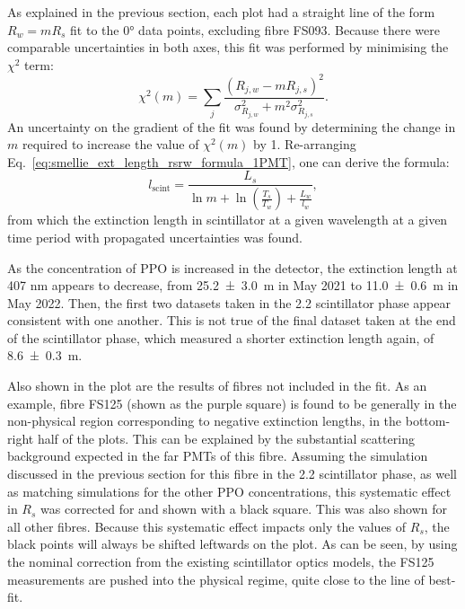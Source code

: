 As explained in the previous section, each plot had a straight line of the form $R_{w} = mR_{s}$ fit to the \ang{0} data points, excluding fibre FS093. Because there were comparable uncertainties in both axes, this fit was performed by minimising the $\chi^{2}$ term:
\begin{equation}
    \chi^{2}(m) = \sum_{j}\frac{\left(R_{j,w} - mR_{j,s}\right)^{2}}{\sigma^{2}_{R_{j,w}} + m^{2}\sigma^{2}_{R_{j,s}}}.
\end{equation}
An uncertainty on the gradient of the fit was found by determining the change in $m$ required to increase the value of $\chi^{2}(m)$ by 1. Re-arranging Eq.~\ref{eq:smellie_ext_length_rsrw_formula_1PMT}, one can derive the formula:
\begin{equation}
    l_{\mathrm{scint}} = 
    \frac{
        L_{s}
        }{
        \ln{m}
        + \ln\left(
            \frac{T_{s}}{T_{w}}
        \right)
        + \frac{L_{w}}{l_{w}}
    },
\end{equation}
from which the extinction length in scintillator at a given wavelength at a given time period with propagated uncertainties was found.

As the concentration of PPO is increased in the detector, the extinction length at 407 nm appears to decrease, from \SI{25.2 \pm 3.0}{\metre} in May 2021 to \SI{11.0 \pm 0.6}{\metre} in May 2022. Then, the first two datasets taken in the \SI{2.2}{\gpl} scintillator phase appear consistent with one another. This is not true of the final dataset taken at the end of the scintillator phase, which measured a shorter extinction length again, of \SI{8.6 \pm 0.3}{\metre}.

Also shown in the plot are the results of fibres not included in the fit. As an example, fibre FS125 (shown as the purple square) is found to be generally in the non-physical region corresponding to negative extinction lengths, in the bottom-right half of the plots. This can be explained by the substantial scattering background expected in the far PMTs of this fibre. Assuming the simulation discussed in the previous section for this fibre in the \SI{2.2}{\gpl} scintillator phase, as well as matching simulations for the other PPO concentrations, this systematic effect in $R_{s}$ was corrected for and shown with a black square. This was also shown for all other fibres. Because this systematic effect impacts only the values of $R_{s}$, the black points will always be shifted leftwards on the plot. As can be seen, by using the nominal correction from the existing scintillator optics models, the FS125 measurements are pushed into the physical regime, quite close to the line of best-fit.

